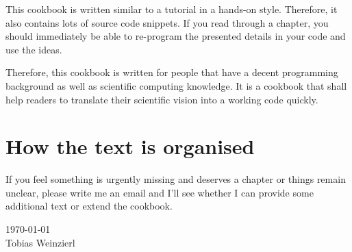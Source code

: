 This cookbook is written similar to a tutorial in a hands-on style.
Therefore, it also contains lots of source code snippets.
If you read through a chapter, you should immediately be able to re-program the
presented details in your code and use the ideas.

Therefore, this cookbook is written for people that have a decent programming
background as well as scientific computing knowledge.
It is a cookbook that shall help readers to translate their scientific vision
into a working code quickly.


\section*{How the text is organised}

If you feel something is urgently missing and deserves a chapter or things
remain unclear, please write me an email and I'll see whether I can provide some
additional text or extend the cookbook.


{
  \flushright
  \today 
  \\ 
  Tobias Weinzierl 
  \\
}

 